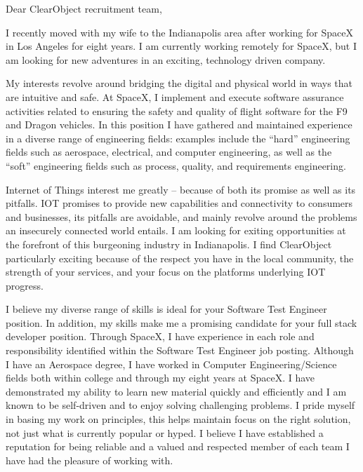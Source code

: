 \begin{cvletter}

Dear ClearObject recruitment team,

I recently moved with my wife to the Indianapolis area after working
for SpaceX in Los Angeles for eight years. I am currently working
remotely for SpaceX, but I am looking for new adventures in an
exciting, technology driven company.

My interests revolve around bridging the digital and physical world in
ways that are intuitive and safe. At SpaceX, I implement and execute
software assurance activities related to ensuring the safety and
quality of flight software for the F9 and Dragon vehicles. In this
position I have gathered and maintained experience in a diverse range
of engineering fields: examples include the ``hard'' engineering
fields such as aerospace, electrical, and computer engineering, as
well as the ``soft'' engineering fields such as process, quality, and
requirements engineering.




Internet of Things interest me greatly -- because of both its promise
as well as its pitfalls. IOT promises to provide new capabilities and
connectivity to consumers and businesses, its pitfalls are avoidable,
and mainly revolve around the problems an insecurely connected world
entails. I am looking for exiting opportunities at the forefront of
this burgeoning industry in Indianapolis. I find ClearObject
particularly exciting because of the respect you have in the local
community, the strength of your services, and your focus on the
platforms underlying IOT progress.



I believe my diverse range of skills is ideal for your Software Test
Engineer position. In addition, my skills make me a promising
candidate for your full stack developer position. Through SpaceX, I
have experience in each role and responsibility identified within the
Software Test Engineer job posting. Although I have an Aerospace
degree, I have worked in Computer Engineering/Science fields both
within college and through my eight years at SpaceX. I have
demonstrated my ability to learn new material quickly and efficiently
and I am known to be self-driven and to enjoy solving challenging
problems. I pride myself in basing my work on principles, this helps
maintain focus on the right solution, not just what is currently
popular or hyped. I believe I have established a reputation for being
reliable and a valued and respected member of each team I have had the
pleasure of working with.


\end{cvletter}
